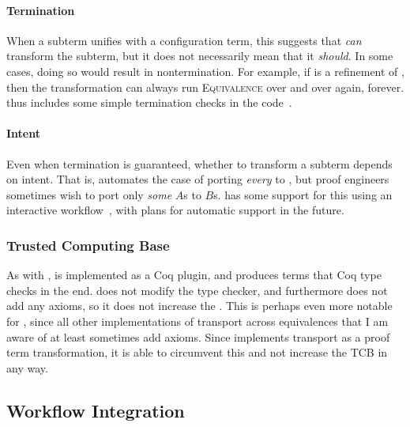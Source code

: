 \paragraph{Termination}
When a subterm unifies with a configuration term, this suggests that \toolnamec \textit{can}
transform the subterm, but it does not necessarily mean that it \textit{should}.
In some cases, doing so would result in nontermination.
For example, if \B is a refinement of \Aa, then the transformation can always run \textsc{Equivalence}
over and over again, forever.
\toolnamec thus includes some simple termination checks in the code~\href{https://github.com/uwplse/pumpkin-pi/blob/v2.0.0/plugin/src/automation/lift/liftrules.ml}{}. %

\paragraph{Intent}
Even when termination is guaranteed, whether to transform a subterm depends on intent.
That is, \toolnamec automates the case of porting \textit{every} \Aa to \B,
but proof engineers sometimes wish to port only \textit{some} $A$s to $B$s.
\toolnamec has some support for this using an interactive workflow~\href{https://github.com/uwplse/pumpkin-pi/blob/v2.0.0/plugin/coq/minimal_records.v}{},
with plans for automatic support in the future. %

\subsubsection{Trusted Computing Base}
\label{sec:pi-tcb}

As with \sysname, \toolnamec is implemented as a Coq plugin, and produces terms that Coq type checks in the end.
\toolnamec does not modify the type checker, and furthermore does not add any axioms, so it does not increase the .
This is perhaps even more notable for \toolnamec, since all other implementations of transport across equivalences
that I am aware of at least sometimes add axioms.
Since \toolnamec implements transport as a proof term transformation, it is able to circumvent this and not increase the TCB in any way.

\subsection{Workflow Integration}
\label{sec:pi-workflow}

